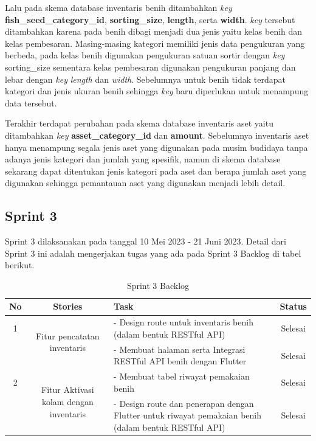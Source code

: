 \begin{spacing}{1.5}
	Lalu pada skema database inventaris benih ditambahkan \textit{key} \textbf{fish\_seed\_category\_id}, \textbf{sorting\_size}, \textbf{length}, serta \textbf{width}. \textit{key} tersebut ditambahkan karena pada benih dibagi menjadi dua jenis yaitu kelas benih dan kelas pembesaran. Masing-masing kategori memiliki jenis data pengukuran yang berbeda, pada kelas benih digunakan pengukuran satuan sortir dengan \textit{key} sorting\_size sementara kelas pembesaran digunakan pengukuran panjang dan lebar dengan \textit{key} \textit{length} dan \textit{width}. Sebelumnya untuk benih tidak terdapat kategori dan jenis ukuran benih sehingga \textit{key} baru diperlukan untuk menampung data tersebut.

	Terakhir terdapat perubahan pada skema database inventaris aset yaitu ditambahkan \textit{key} \textbf{asset\_category\_id} dan \textbf{amount}. Sebelumnya inventaris aset hanya menampung segala jenis aset yang digunakan pada musim budidaya tanpa adanya jenis kategori dan jumlah yang spesifik, namun di skema database sekarang dapat ditentukan jenis kategori pada aset dan berapa jumlah aset yang digunakan sehingga pemantauan aset yang digunakan menjadi lebih detail.

\subsection{Sprint 3}

	Sprint 3 dilaksanakan pada tanggal 10 Mei 2023 - 21 Juni 2023. Detail dari Sprint 3 ini adalah mengerjakan tugas yang ada pada Sprint 3 Backlog di tabel berikut.
		
	\begin{table}[H]	
		\begin{center}
			\caption{Sprint 3 Backlog}
			\label{tab:table20}
			\begin{tabular}{|c|c|m{13em}|c|}
			\hline
			\textbf{No} & \textbf{Stories} & \textbf{Task} & \textbf{Status} \\
			\hline
			1 & \multirow{2}{12em}{Fitur pencatatan inventaris} & - Design route untuk inventaris benih (dalam bentuk RESTful API) & Selesai \\
			&  & - Membuat halaman serta Integrasi RESTful API benih dengan Flutter & Selesai \\ 
			\hline
			2 & \multirow{2}{12em}{Fitur Aktivasi kolam dengan inventaris} & - Membuat tabel riwayat pemakaian benih & Selesai \\
			&  & - Design route dan penerapan dengan Flutter untuk riwayat pemakaian benih (dalam bentuk RESTful API) & Selesai \\ 
			\hline
			\end{tabular}
		\end{center}
	\end{table}


\end{spacing}
